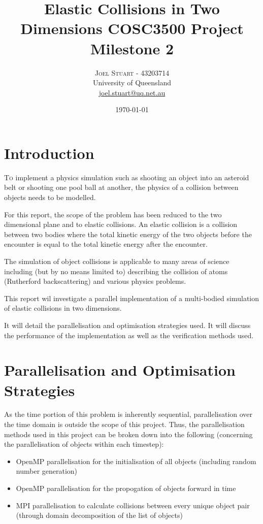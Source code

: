 \documentclass[twoside,twocolumn]{article}
\title{Elastic Collisions in Two Dimensions COSC3500 Project Milestone 2} %
\author{%
	\textsc{Joel Stuart - 43203714} \\[1ex] %
	\normalsize University of Queensland \\ %
	\normalsize \href{mailto:joel.stuart@uq.net.au}{joel.stuart@uq.net.au} %
}
\date{\today} %
\begin{document}
	
	\maketitle
	
	\section{Introduction}
	
	\lettrine[nindent=0em,lines=3]{T}o implement a physics simulation such as shooting an object into an asteroid belt or shooting one pool ball at another, the physics of a collision between objects needs to be modelled. \newline
	
	For this report, the scope of the problem has been reduced to the two dimensional plane and to elastic collisions. An elastic collision is a collision between two bodies where the total kinetic energy of the two objects before the encounter is equal to the total kinetic energy after the encounter. \newline 
	
	The simulation of object collisions is applicable to many areas of science including (but by no means limited to) describing the collision of atoms (Rutherford backscattering) and various physics problems.\newline 
	
	This report wil investigate a parallel implementation of a multi-bodied simulation of elastic collisions in two dimensions.\newline
	
	 It will detail the parallelisation and optimisation strategies used. It will discuss the performance of the implementation as well as the verification methods used.
	
	
	\section{Parallelisation and Optimisation Strategies}
	As the time portion of this problem is inherently sequential, parallelisation over the time domain is outside the scope of this project. \newline 
	Thus, the parallelisation methods used in this project can be broken down into the following (concerning the parallelisation of objects within each timestep):
	
	\begin{itemize}
		\item OpenMP parallelisation for the initialisation of all objects (including random number generation)
		\item OpenMP parallelisation for the propogation of objects forward in time
		\item MPI parallelisation to calculate collisions between every unique object pair (through domain decomposition of the list of objects)
	\end{itemize}
	
\end{document}
